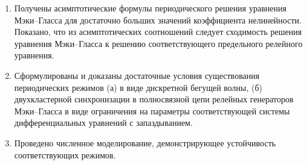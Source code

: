 
\begin{enumerate}
  \item Получены асимптотические формулы периодического решения уравнения Мэки--Гласса для достаточно больших значений коэффициента нелинейности. Показано, что из асимптотических соотношений следует сходимость решения уравнения Мэки--Гласса к решению соответствующего предельного релейного уравнения.
  \item Сформулированы и доказаны достаточные условия существования периодических режимов (а) в виде дискретной бегущей волны, (б) двухкластерной синхронизации в полносвязной цепи релейных генераторов Мэки--Гласса в виде ограничения на параметры соответствующей системы дифференциальных уравнений с запаздыванием. 
  \item Проведено численное моделирование, демонстрирующее устойчивость соответствующих режимов.
\end{enumerate}
